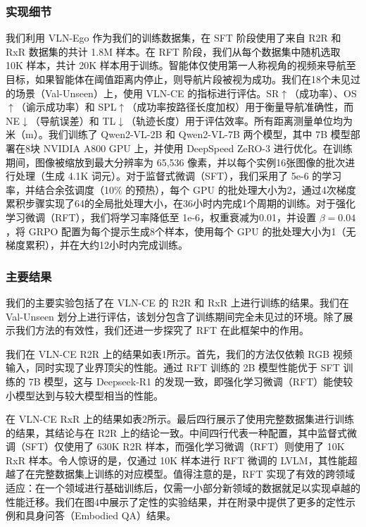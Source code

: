 \subsubsection{实现细节}

我们利用 VLN-Ego 作为我们的训练数据集，在 SFT 阶段使用了来自 R2R 和 RxR 数据集的共计 1.8M 样本。在 RFT 阶段，我们从每个数据集中随机选取 10K 样本，共计 20K 样本用于训练。智能体仅使用第一人称视角的视频来导航至目标，如果智能体在阈值距离内停止，则导航片段被视为成功。我们在18个未见过的场景（Val-Unseen）上，使用 VLN-CE 的指标进行评估。SR$\uparrow$（成功率）、OS$\uparrow$（谕示成功率）和 SPL$\uparrow$（成功率按路径长度加权）用于衡量导航准确性，而 NE$\downarrow$（导航误差）和 TL$\downarrow$（轨迹长度）用于评估效率。所有距离测量单位均为米（m）。我们训练了 Qwen2-VL-2B 和 Qwen2-VL-7B 两个模型，其中 7B 模型部署在8块 NVIDIA A800 GPU 上，并使用 DeepSpeed ZeRO-3 进行优化。在训练期间，图像被缩放到最大分辨率为 65,536 像素，并以每个实例16张图像的批次进行处理（生成 4.1K 词元）。对于监督式微调（SFT），我们采用了 5e-6 的学习率，并结合余弦调度（10\% 的预热），每个 GPU 的批处理大小为2，通过4次梯度累积步骤实现了64的全局批处理大小，在36小时内完成1个周期的训练。对于强化学习微调（RFT），我们将学习率降低至 1e-6，权重衰减为0.01，并设置 $ \beta=0.04 $，将 GRPO 配置为每个提示生成8个样本，使用每个 GPU 的批处理大小为1（无梯度累积），并在大约12小时内完成训练。

\subsubsection{主要结果}

我们的主要实验包括了在 VLN-CE 的 R2R 和 RxR 上进行训练的结果。我们在 Val-Unseen 划分上进行评估，该划分包含了训练期间完全未见过的环境。除了展示我们方法的有效性，我们还进一步探究了 RFT 在此框架中的作用。

我们在 VLN-CE R2R 上的结果如表1所示。首先，我们的方法仅依赖 RGB 视频输入，同时实现了业界顶尖的性能。通过 RFT 训练的 2B 模型性能优于 SFT 训练的 7B 模型，这与 Deepseek-R1 的发现一致，即强化学习微调（RFT）能使较小模型达到与较大模型相当的性能。

在 VLN-CE RxR 上的结果如表2所示。最后四行展示了使用完整数据集进行训练的结果，其结论与在 R2R 上的结论一致。中间四行代表一种配置，其中监督式微调（SFT）仅使用了 630K R2R 样本，而强化学习微调（RFT）则使用了 10K RxR 样本。令人惊讶的是，仅通过 10K 样本进行 RFT 微调的 LVLM，其性能超越了在完整数据集上训练的对应模型。值得注意的是，RFT 实现了有效的跨领域适应：在一个领域进行基础训练后，仅需一小部分新领域的数据就足以实现卓越的性能迁移。我们在图4中展示了定性的实验结果，并在附录中提供了更多的定性示例和具身问答（Embodied QA）结果。


